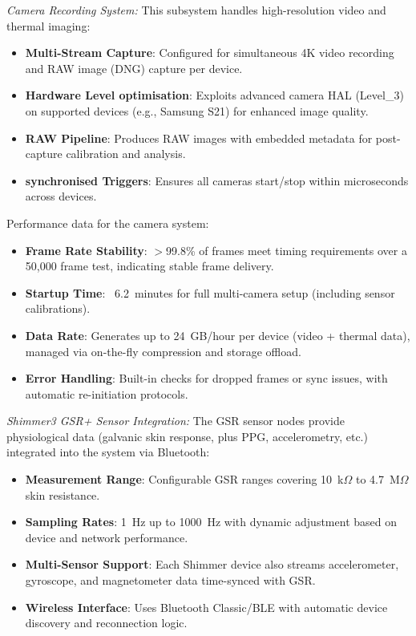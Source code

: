 \documentclass[11pt,a4paper]{report}
\begin{document}
{\emph{Camera Recording System:} This subsystem handles high-resolution video and thermal imaging:

\begin{itemize}
    \item \textbf{Multi-Stream Capture}: Configured for simultaneous 4K video recording and RAW image (DNG) capture per device.
    \item \textbf{Hardware Level optimisation}: Exploits advanced camera HAL (Level\_3) on supported devices (e.g., Samsung S21) for enhanced image quality.
    \item \textbf{RAW Pipeline}: Produces RAW images with embedded metadata for post-capture calibration and analysis.
    \item \textbf{synchronised Triggers}: Ensures all cameras start/stop within microseconds across devices.
\end{itemize}

Performance data for the camera system:

\begin{itemize}
    \item \textbf{Frame Rate Stability}: $>$99.8\% of frames meet timing requirements over a 50,000 frame test, indicating stable frame delivery.
    \item \textbf{Startup Time}: ~6.2~minutes for full multi-camera setup (including sensor calibrations).
    \item \textbf{Data Rate}: Generates up to 24~GB/hour per device (video + thermal data), managed via on-the-fly compression and storage offload.
    \item \textbf{Error Handling}: Built-in checks for dropped frames or sync issues, with automatic re-initiation protocols.
\end{itemize}

\emph{Shimmer3 GSR+ Sensor Integration:} The GSR sensor nodes provide physiological data (galvanic skin response, plus PPG, accelerometry, etc.) integrated into the system via Bluetooth:

\begin{itemize}
    \item \textbf{Measurement Range}: Configurable GSR ranges covering 10~k$\Omega$ to 4.7~M$\Omega$ skin resistance.
    \item \textbf{Sampling Rates}: 1~Hz up to 1000~Hz with dynamic adjustment based on device and network performance.
    \item \textbf{Multi-Sensor Support}: Each Shimmer device also streams accelerometer, gyroscope, and magnetometer data time-synced with GSR.
    \item \textbf{Wireless Interface}: Uses Bluetooth Classic/BLE with automatic device discovery and reconnection logic.
\end{itemize}

}
\end{document}
